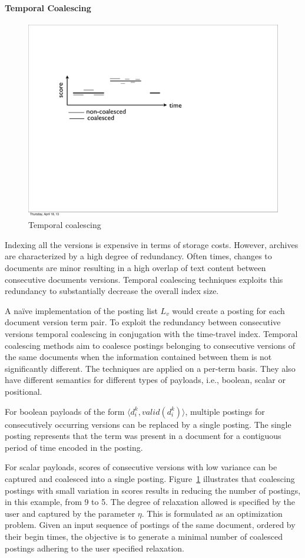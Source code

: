   
\paragraph{Temporal Coalescing} 
 \begin{figure}[tb]
  \centering
    \includegraphics[width=0.7\columnwidth]{resources/coalescing.pdf}
  \caption{Temporal coalescing} 
    \label{fig:coalescing}
\end{figure}

Indexing all the versions is expensive in terms of storage costs. However, archives are characterized by a high degree of redundancy. Often times, changes to documents are minor resulting in a high overlap of text content between consecutive documents versions. Temporal coalescing techniques exploits this redundancy to substantially decrease the overall index size.

A na\"ive implementation of the posting list $L_v$ would create a posting for each document version term pair. To exploit the redundancy between consecutive versions temporal coalescing in conjugation with the time-travel index. Temporal coalescing methods aim to coalesce postings belonging to consecutive versions of the same documents when the information contained between them is not significantly different. The techniques are applied on a per-term basis. They also have different semantics for different types of payloads, i.e., boolean, scalar or positional.

For boolean payloads of the form $\langle d_i^k, valid(d_i^{k}) \rangle$, multiple postings for consecutively occurring versions can be replaced by a single posting. The single posting represents that the term was present in a document for a contiguous period of time encoded in the posting. 

For scalar payloads, scores of consecutive versions with low variance can be captured and coalesced into a single posting. Figure~\ref{fig:coalescing} illustrates that coalescing postings with small variation in scores results in reducing the number of postings, in this example, from 9 to 5. The degree of relaxation allowed is specified by the user and captured by the parameter $\eta$. This is formulated as an optimization problem. Given an input sequence of postings of the same document, ordered by their begin times, the objective is to generate a minimal number of coalesced postings adhering to the user specified relaxation. 


